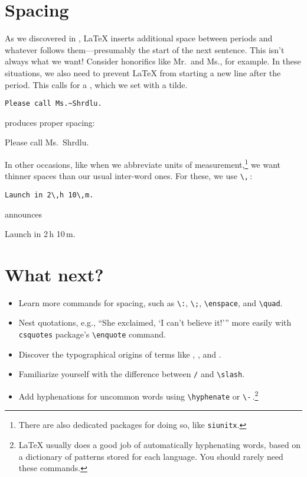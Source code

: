 \section{Spacing}

As we discovered in ,
\LaTeX{} inserts additional space between periods and whatever
follows them---presumably the start of the next sentence.
This isn't always what we want!
Consider honorifics like Mr.\ and Ms., for example.
In these situations, we also need to prevent \LaTeX{} from starting a
new line after the period.
This calls for a , which we set with a tilde.
\begin{leftfigure}
\begin{lstlisting}
Please call Ms.~Shrdlu.
\end{lstlisting}
\end{leftfigure}
produces proper spacing:
\begin{leftfigure}
\lm%
Please call Ms.~Shrdlu.
\end{leftfigure}

In other occasions, like when we abbreviate units of
measurement,\punckern\footnote{There are also dedicated packages for doing so,
like \texttt{siunitx}.}
we want thinner spaces than our usual inter-word ones.
For these, we use \verb|\,|\,:
\begin{leftfigure}
\begin{lstlisting}
Launch in 2\,h 10\,m.
\end{lstlisting}
\end{leftfigure}
announces
\begin{leftfigure}
\lm%
Launch in 2\,h 10\,m.
\end{leftfigure}

\section{What next?}
\begin{itemize}
\item Learn more commands for spacing, such as \verb|\:|, \verb|\;|,
    \verb|\enspace|, and \verb|\quad|.
\item Nest quotations, e.g.,
    \enquote{She exclaimed, \enquote{I can't believe it!}}
    more easily with  \texttt{csquotes} package's \verb|\enquote| command.
\item Discover the typographical origins of terms like ,
    , and .
\item Familiarize yourself with the difference between \texttt{/} and
    \verb|\slash|.
\item Add hyphenations for uncommon words using \verb|\hyphenate|
    or \verb|\-|\,.\punckern\footnote{\LaTeX{} usually does a good
    job of automatically hyphenating words, based on a dictionary of patterns
    stored for each language. You should rarely need these commands.}
\end{itemize}
